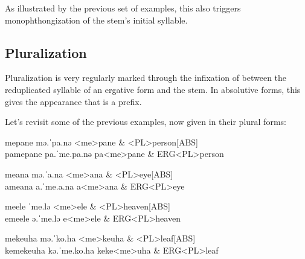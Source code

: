 As illustrated by the previous set of examples, this also triggers mono\-phthongization of the stem's initial syllable.

\subsection{Pluralization}\label{sec:pluralization}
Pluralization is very regularly marked through the infixation of  between the reduplicated syllable of an ergative form and the stem. In absolutive forms, this gives the appearance that  is a prefix.

Let's revisit some of the previous examples, now given in their plural forms:

\begin{subexamples}
  \ex
    \preamble mepane
    \pronunciation mə.ˈpa.nə
    \gloss
      <me>pane & <PL>person[ABS] \\
  \ex
    \preamble pamepane
    \pronunciation pa.ˈme.pa.nə
    \gloss
      pa\allo <me>pane & ERG\allo <PL>person \\
\end{subexamples}

\begin{subexamples}
  \ex
    \preamble meana
    \pronunciation mə.ˈa.na
    \gloss
      <me>ana & <PL>eye[ABS] \\
  \ex
    \preamble ameana
    \pronunciation a.ˈme.a.na
    \gloss
      a\allo <me>ana & ERG\allo <PL>eye \\
\end{subexamples}


\begin{subexamples}
  \label{ex:double-schwa}
  \ex
  \preamble meele
  \pronunciation ˈme.lə
  \gloss
    <me>ele & <PL>heaven[ABS] \\
  \ex
    \label{ex:double-schwa-erg}
    \preamble emeele
    \pronunciation ə.ˈme.lə
    \gloss
      e\allo <me>ele & ERG\allo <PL>heaven \\
\end{subexamples}


\begin{subexamples}
  \ex
    \preamble mekeuha
    \pronunciation mə.ˈko.ha
    \gloss
      <me>keuha & <PL>leaf[ABS] \\
  \ex
    \preamble kemekeuha
    \pronunciation kə.ˈme.ko.ha
    \gloss
      ke\allo ke<me>uha & ERG\allo <PL>leaf \\
\end{subexamples}

